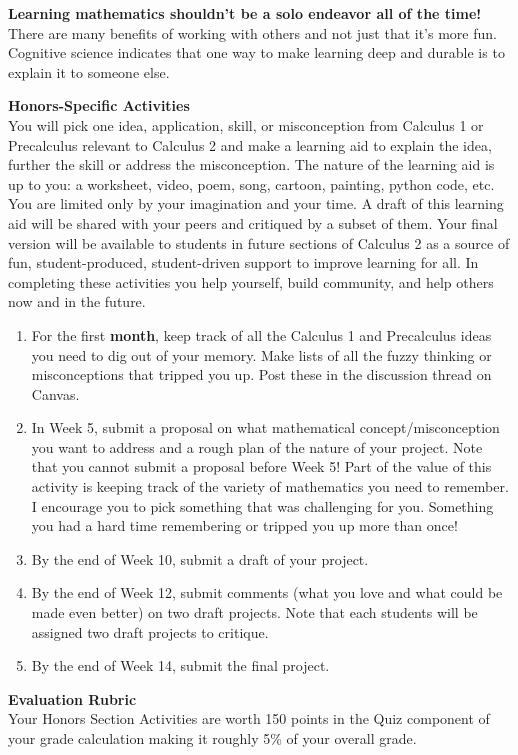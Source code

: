 \documentclass[12pt]{article}
\renewcommand{\emph}[1]{\textsf{\textbf{#1}}}
\newcommand{\localhead}[1]{\par\smallskip\textbf{#1} \smallskip\nobreak\\}%
\def\heading#1{\localhead{\large\emph{#1}}}
\begin{document}
\textbf{Learning mathematics shouldn't be a solo endeavor all of the time!} There are many benefits of working with others and not just that it's more fun. Cognitive science indicates that one way to make learning deep and durable is to explain it to someone else. 

\heading{Honors-Specific Activities}
You will pick one idea, application, skill, or misconception from Calculus 1 or Precalculus relevant to Calculus 2 and make a learning aid to explain the idea, further the skill or address the misconception. The nature of the learning aid is up to you: a worksheet, video, poem, song, cartoon, painting, python code, etc. You are limited only by your imagination and your time. A draft of this learning aid will be shared with your peers and critiqued by a subset of them. Your final version will be available to students in future sections of Calculus 2 as a source of fun, student-produced, student-driven support to improve learning for all. In completing these activities you help yourself, build community, and help others now and in the future.


\begin{enumerate}
\item For the first \emph{month}, keep track of all the Calculus 1 and Precalculus ideas you need to dig out of your memory. Make lists of all the fuzzy thinking  or misconceptions that tripped you up. Post these in the discussion thread on Canvas.
\item In Week 5, submit a proposal on what mathematical concept/misconception you want to address and a rough plan of the nature of your project. Note that you cannot submit a proposal before Week 5! Part of the value of this activity is keeping track of the variety of mathematics you need to remember. I encourage you to pick something that was challenging for you. Something you had a hard time remembering or tripped you up more than  once!
\item By the end of Week 10, submit a draft of your project.
\item By the end of Week 12, submit comments (what you love and what could be made even better) on two draft projects. Note that each students will be assigned two draft projects to critique.
\item By the end of Week 14, submit the final project.
\end{enumerate}

\heading{Evaluation Rubric}
Your Honors Section Activities are worth 150 points in the Quiz component of your grade calculation making it roughly 5\% of your overall grade. 
\end{document}
